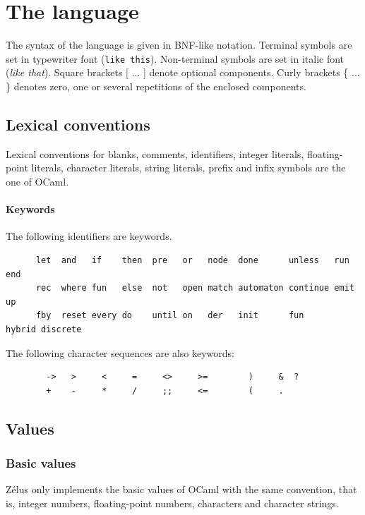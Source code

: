 \documentclass[11pt,titlepage,twoside]{report}
\newcommand{\zelus}{{\sf Z\'elus}}
\newcommand{\ocaml}{{\sf OCaml}}
\newcommand{\term}[1]{{\tt #1}}
\newcommand{\nterm}[1]{{\em #1}}
\begin{document}
\chapter{The language} %


The syntax of the language is given in BNF-like notation. Terminal
symbols are set in typewriter font (\term{like this}). Non-terminal symbols
are set in italic font (\nterm{like that}). Square brackets [ ... ] denote
optional components. Curly brackets \{ ... \} denotes zero, one or several
repetitions of the enclosed components.


\section{Lexical conventions}

Lexical conventions for blanks, comments, identifiers, integer
literals, floating-point literals, character literals, string
literals, prefix and infix symbols are the one of \ocaml.

\subsubsection{Keywords}
The following identifiers are keywords.

\begin{verbatim}
      let  and   if    then  pre   or   node  done      unless   run    end
      rec  where fun   else  not   open match automaton continue emit   up
      fby  reset every do    until on   der   init      fun      hybrid discrete
\end{verbatim}
The following character sequences are also keywords:

\begin{verbatim}
        ->   >     <     =     <>     >=        )     &  ?
        +    -     *     /     ;;     <=        (     .
\end{verbatim}

\section{Values}

\subsection{Basic values}
\zelus{} only implements the basic values of \ocaml{} with the same
convention, that is, integer numbers, floating-point numbers,
characters and character strings.
\end{document}
